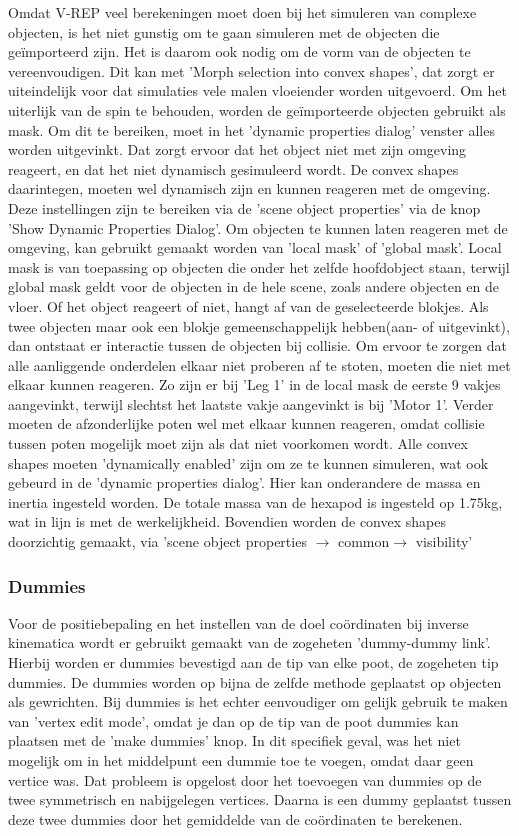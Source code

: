 \documentclass[10pt,a4paper]{article}
\begin{document}
Omdat V-REP veel berekeningen moet doen bij het simuleren van complexe objecten, is het niet gunstig om te gaan simuleren met de objecten die ge\"importeerd zijn. Het is daarom ook nodig om de vorm van de objecten te vereenvoudigen. Dit kan met 'Morph selection into convex shapes', dat zorgt er uiteindelijk voor dat simulaties vele malen vloeiender worden uitgevoerd. 
Om het uiterlijk van de spin te behouden, worden de ge\"importeerde objecten gebruikt als mask. Om dit te bereiken, moet in het 'dynamic properties dialog' venster alles worden uitgevinkt. Dat zorgt ervoor dat het object niet met zijn omgeving reageert, en dat het niet dynamisch gesimuleerd wordt.
De convex shapes daarintegen, moeten wel dynamisch zijn en kunnen reageren met de omgeving. Deze instellingen zijn te bereiken via de 'scene object properties' via de knop 'Show Dynamic Properties Dialog'. Om objecten te kunnen laten reageren met de omgeving, kan gebruikt gemaakt worden van 'local mask' of 'global mask'. Local mask is van toepassing op objecten die onder het zelfde hoofdobject staan, terwijl global mask geldt voor de objecten in de hele scene, zoals andere objecten en de vloer. Of het object reageert of niet, hangt af van de geselecteerde blokjes. 
Als twee objecten maar ook een blokje gemeenschappelijk hebben(aan- of uitgevinkt), dan ontstaat er interactie tussen de objecten bij collisie. Om ervoor te zorgen dat alle aanliggende onderdelen elkaar niet proberen af te stoten, moeten die niet met elkaar kunnen reageren. Zo zijn er bij 'Leg 1' in de local mask de eerste 9 vakjes aangevinkt, terwijl slechtst het laatste vakje aangevinkt is bij 'Motor 1'.
Verder moeten de afzonderlijke poten wel met elkaar kunnen reageren, omdat collisie tussen poten mogelijk moet zijn als dat niet voorkomen wordt. 
Alle convex shapes moeten 'dynamically enabled' zijn om ze te kunnen simuleren, wat ook gebeurd in de 'dynamic properties dialog'. Hier kan onderandere de massa en inertia ingesteld worden. De totale massa van de hexapod is ingesteld op 1.75kg, wat in lijn is met de werkelijkheid.
Bovendien worden de convex shapes doorzichtig gemaakt, via 
'scene object properties $\rightarrow$ common$\rightarrow$ visibility'
\subsubsection{Dummies}
Voor de positiebepaling en het instellen van de doel co\"ordinaten bij inverse kinematica wordt er gebruikt gemaakt van de zogeheten 'dummy-dummy link'. Hierbij worden er dummies bevestigd aan de tip van elke poot, de zogeheten tip dummies. De dummies worden op bijna de zelfde methode geplaatst op objecten als gewrichten. Bij dummies is het echter eenvoudiger om gelijk gebruik te maken van 'vertex edit mode', omdat je dan op de tip van de poot dummies kan plaatsen met de 'make dummies' knop. In dit specifiek geval, was het niet mogelijk om in het middelpunt een dummie toe te voegen, omdat daar geen vertice was. Dat probleem is opgelost door het toevoegen van dummies op de twee symmetrisch en nabijgelegen vertices. Daarna is een dummy geplaatst tussen deze twee dummies door het gemiddelde van de co\"ordinaten te berekenen.
\end{document}
